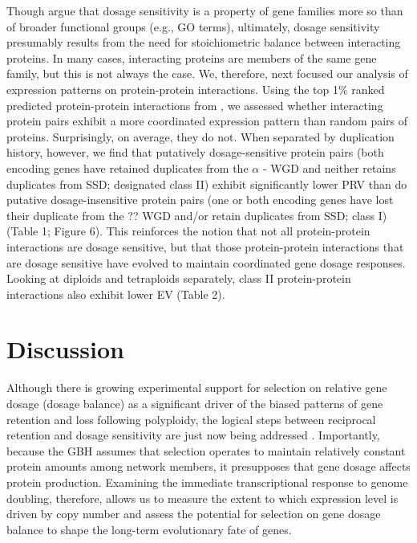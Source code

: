 \documentclass[11pt]{article}
\begin{document}
Though \cite{tasdighian2017} argue that dosage sensitivity is a property of gene families more so than of broader functional groups (e.g., GO terms), ultimately, dosage sensitivity presumably results from the need for stoichiometric balance between interacting proteins. In many cases, interacting proteins are members of the same gene family, but this is not always the case. We, therefore, next focused our analysis of expression patterns on protein-protein interactions. Using the top 1\% ranked predicted protein-protein interactions from \cite{dong2019}, we assessed whether interacting protein pairs exhibit a more coordinated expression pattern than random pairs of proteins. Surprisingly, on average, they do not. When separated by duplication history, however, we find that putatively dosage-sensitive protein pairs (both encoding genes have retained duplicates from the $\alpha$ - WGD and neither retains duplicates from SSD; designated class II) exhibit significantly lower PRV than do putative dosage-insensitive protein pairs (one or both encoding genes have lost their duplicate from the ?? WGD and/or retain duplicates from SSD; class I) (Table 1; Figure 6). This reinforces the notion that not all protein-protein interactions are dosage sensitive, but that those protein-protein interactions that are dosage sensitive have evolved to maintain coordinated gene dosage responses. Looking at diploids and tetraploids separately, class II protein-protein interactions also exhibit lower EV (Table 2). 

\section*{Discussion}

Although there is growing experimental support for selection on relative gene dosage (dosage balance) as a significant driver of the biased patterns of gene retention and loss following polyploidy, the logical steps between reciprocal retention and dosage sensitivity are just now being addressed \citep{tasdighian2017, coate2016}. Importantly, because the GBH assumes that selection operates to maintain relatively constant protein amounts among network members, it presupposes that gene dosage affects protein production. Examining the immediate transcriptional response to genome doubling, therefore, allows us to measure the extent to which expression level is driven by copy number and assess the potential for selection on gene dosage balance to shape the long-term evolutionary fate of genes.
\end{document}
